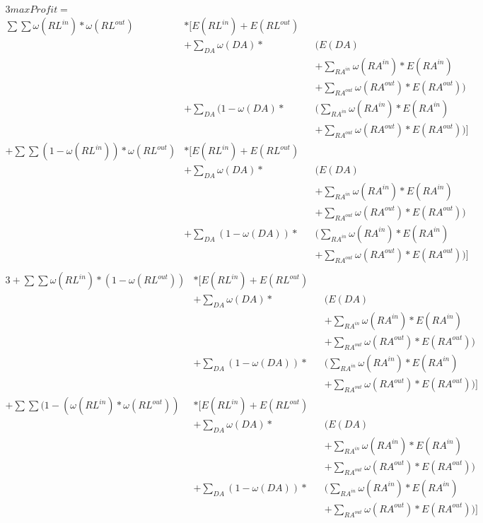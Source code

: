 \documentclass{article}
\begin{document}
\begin{alignat*}{3}
max Profit = \\
\sum \sum \omega(RL^{in})* \omega(RL^{out}) &* \Biggl[E(RL^{in}) + E(RL^{out}) \\
& +\sum_{DA} \omega(DA) *&&\Biggl(E(DA)\\
	&    &&+ \sum_{RA^{in}} \omega(RA^{in}) * E(RA^{in})\\
	&    &&+ \sum_{RA^{out}} \omega(RA^{out}) * E(RA^{out})\Biggr)\\
& +\sum_{DA} (1- \omega(DA) * &&\Biggl(\sum_{RA^{in}} \omega(RA^{in}) * E(RA^{in}) \\
	&    &&+ \sum_{RA^{out}} \omega(RA^{out}) * E(RA^{out})\Biggr) \Biggr]\\
+\sum \sum (1-\omega(RL^{in})) * \omega(RL^{out}) &* \Biggl[E(RL^{in}) + E(RL^{out}) \\
& +\sum_{DA} \omega(DA) *&&\Biggl(E(DA)\\
	&    &&+ \sum_{RA^{in}} \omega(RA^{in}) * E(RA^{in})\\
	&    &&+ \sum_{RA^{out}} \omega(RA^{out}) * E(RA^{out})\Biggr)\\
& +\sum_{DA} (1- \omega(DA)) * &&\Biggl(\sum_{RA^{in}} \omega(RA^{in}) * E(RA^{in}) \\
	&    &&+ \sum_{RA^{out}} \omega(RA^{out}) * E(RA^{out})\Biggr) \Biggr]\\
\end{alignat*}
\begin{alignat*}{3}
+\sum \sum \omega(RL^{in})* (1-\omega(RL^{out}))& * \Biggl[E(RL^{in}) + E(RL^{out}) \\
& +\sum_{DA} \omega(DA) *&&\Biggl(E(DA)\\
	&    &&+ \sum_{RA^{in}} \omega(RA^{in}) * E(RA^{in})\\
	&    &&+ \sum_{RA^{out}} \omega(RA^{out}) * E(RA^{out})\Biggr)\\
 & +\sum_{DA} (1- \omega(DA)) * &&\Biggl(\sum_{RA^{in}} \omega(RA^{in}) * E(RA^{in}) \\
	&    &&+ \sum_{RA^{out}} \omega(RA^{out}) * E(RA^{out})\Biggr) \Biggr]\\
+\sum \sum (1-(\omega(RL^{in})* \omega(RL^{out}))& * \Biggl[E(RL^{in}) + E(RL^{out}) \\
& +\sum_{DA} \omega(DA) *&&\Biggl(E(DA)\\
	&    &&+ \sum_{RA^{in}} \omega(RA^{in}) * E(RA^{in})\\
	&    &&+ \sum_{RA^{out}} \omega(RA^{out}) * E(RA^{out})\Biggr)\\
& +\sum_{DA} (1- \omega(DA)) * &&\Biggl(\sum_{RA^{in}}\omega(RA^{in}) * E(RA^{in}) \\
	&    &&+ \sum_{RA^{out}} \omega (RA^{out}) * E(RA^{out})\Biggr) \Biggr]\\
\end{alignat*}
\end{document}
